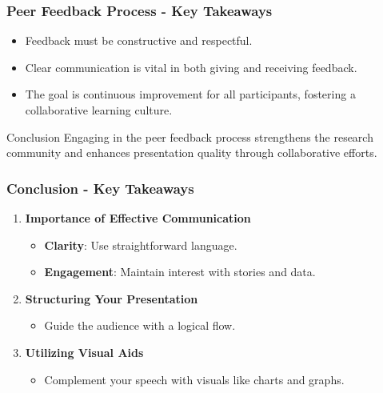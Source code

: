 \documentclass[aspectratio=169]{beamer}
\begin{document}
\begin{frame}[fragile]
    \frametitle{Peer Feedback Process - Key Takeaways}
    \begin{itemize}
        \item Feedback must be constructive and respectful.
        \item Clear communication is vital in both giving and receiving feedback.
        \item The goal is continuous improvement for all participants, fostering a collaborative learning culture.
    \end{itemize}
    \begin{block}{Conclusion}
        Engaging in the peer feedback process strengthens the research community and enhances presentation quality through collaborative efforts.
    \end{block}
\end{frame}

\begin{frame}[fragile]
    \frametitle{Conclusion - Key Takeaways}
    \begin{enumerate}
        \item \textbf{Importance of Effective Communication}
        \begin{itemize}
            \item \textbf{Clarity}: Use straightforward language.
            \item \textbf{Engagement}: Maintain interest with stories and data.
        \end{itemize}
        
        \item \textbf{Structuring Your Presentation}
        \begin{itemize}
            \item Guide the audience with a logical flow.
        \end{itemize}
        
        \item \textbf{Utilizing Visual Aids}
        \begin{itemize}
            \item Complement your speech with visuals like charts and graphs.
        \end{itemize}
    \end{enumerate}
\end{frame}
\end{document}
